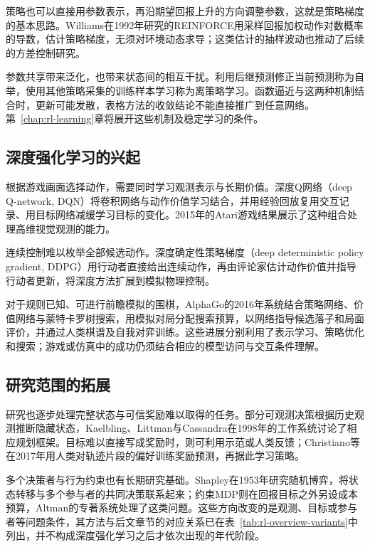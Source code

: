 策略也可以直接用参数表示，再沿期望回报上升的方向调整参数，这就是策略梯度的基本思路。Williams在1992年研究的REINFORCE用采样回报加权动作对数概率的导数，估计策略梯度，无须对环境动态求导；这类估计的抽样波动也推动了后续的方差控制研究。

参数共享带来泛化，也带来状态间的相互干扰。利用后继预测修正当前预测称为自举，使用其他策略采集的训练样本学习称为离策略学习。函数逼近与这两种机制结合时，更新可能发散，表格方法的收敛结论不能直接推广到任意网络。第~\ref{chap:rl-learning}章将展开这些机制及稳定学习的条件。

\subsection{深度强化学习的兴起}
\label{sec:rl-overview-deep}

根据游戏画面选择动作，需要同时学习观测表示与长期价值。深度Q网络（deep Q-network, DQN）将卷积网络与动作价值学习结合，并用经验回放复用交互记录、用目标网络减缓学习目标的变化。2015年的Atari游戏结果展示了这种组合处理高维视觉观测的能力。

连续控制难以枚举全部候选动作。深度确定性策略梯度（deep deterministic policy gradient, DDPG）用行动者直接给出连续动作，再由评论家估计动作价值并指导行动者更新，将深度方法扩展到模拟物理控制。

对于规则已知、可进行前瞻模拟的围棋，AlphaGo的2016年系统结合策略网络、价值网络与蒙特卡罗树搜索，用模拟对局分配搜索预算，以网络指导候选落子和局面评价，并通过人类棋谱及自我对弈训练。这些进展分别利用了表示学习、策略优化和搜索；游戏或仿真中的成功仍须结合相应的模型访问与交互条件理解。

\subsection{研究范围的拓展}
\label{sec:rl-overview-expansion}

研究也逐步处理完整状态与可信奖励难以取得的任务。部分可观测决策根据历史观测推断隐藏状态，Kaelbling、Littman与Cassandra在1998年的工作系统讨论了相应规划框架。目标难以直接写成奖励时，则可利用示范或人类反馈；Christiano等在2017年用人类对轨迹片段的偏好训练奖励预测，再据此学习策略。

多个决策者与行为约束也有长期研究基础。Shapley在1953年研究随机博弈，将状态转移与多个参与者的共同决策联系起来；约束MDP则在回报目标之外另设成本预算，Altman的专著系统处理了这类问题。这些方向改变的是观测、目标或参与者等问题条件，其方法与后文章节的对应关系已在表~\ref{tab:rl-overview-variants}中列出，并不构成深度强化学习之后才依次出现的年代阶段。

